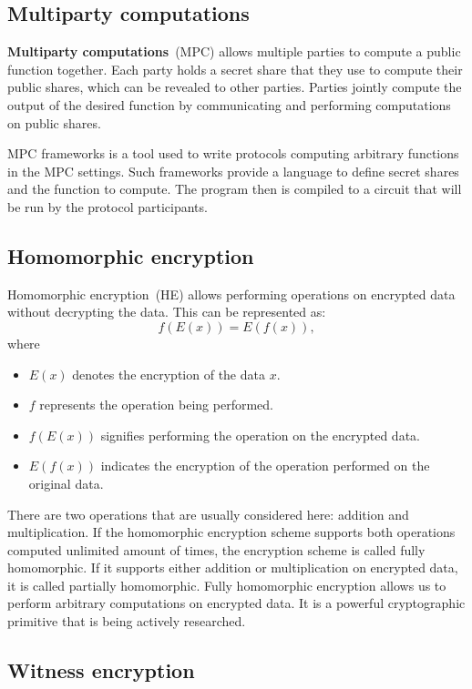 \documentclass[
    9pt,            %
    report,        %
    affiltop,       %
]{art}
\begin{document}
\subsection{Multiparty computations}\label{MPC}

\textbf{Multiparty computations}~(MPC) allows multiple parties to compute a public function together. Each party holds a secret share that they use to compute their public shares, which can be revealed to other parties. Parties jointly compute the output of the desired function by communicating and performing computations on public shares.

MPC frameworks is a tool used to write protocols computing arbitrary functions in the MPC settings. Such frameworks provide a language to define secret shares and the function to compute. The program then is compiled to a circuit that will be run by the protocol participants.

\subsection{Homomorphic encryption}\label{HE}

Homomorphic encryption~(HE) allows performing operations on encrypted data without decrypting the data. This can be represented as: 
$$f(E(x)) = E(f(x)),$$ 
where
\begin{itemize}
\item $E(x)$ denotes the encryption of the data $x$.
\item $f$ represents the operation being performed.
\item $f(E(x))$ signifies performing the operation on the encrypted data.
\item $E(f(x))$ indicates the encryption of the operation performed on the original data.
\end{itemize}

There are two operations that are usually considered here: addition and multiplication. If the homomorphic encryption scheme supports both operations computed unlimited amount of times, the encryption scheme is called fully homomorphic. If it supports either addition or multiplication on encrypted data, it is called partially homomorphic. Fully homomorphic encryption allows us to perform arbitrary computations on encrypted data. It is a powerful cryptographic primitive that is being actively researched.

\subsection{Witness encryption}\label{WE}
\end{document}
